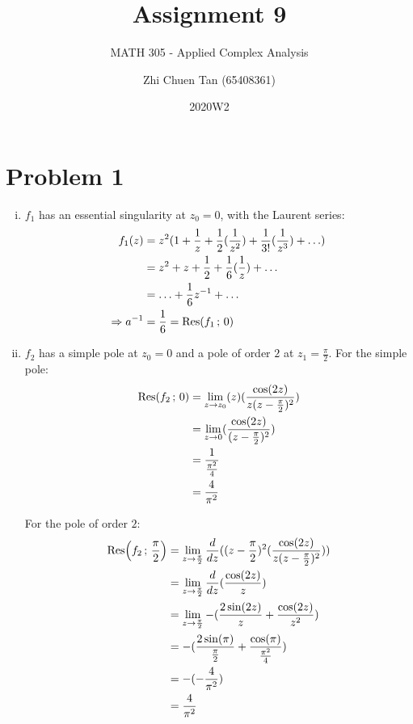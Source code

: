 \documentclass[letterpaper, titlepage, DIV=14]{scrartcl}
\title{Assignment 9}
\subtitle{MATH 305 - Applied Complex Analysis}
\author{Zhi Chuen Tan (65408361)}
\date{2020W2}
\begin{document}
    \onehalfspacing
    \hypersetup{pageanchor=false}
    \begin{titlepage}
        \maketitle
        \vfill
        
    \end{titlepage}
    \hypersetup{pageanchor=true}

    \section*{Problem 1}
    \begin{enumerate}[i)]
      \item $f_{1}$ has an essential singularity at $z_{0}=0$, with the Laurent series:
      \begin{align*}
        f_{1}(z) &= z^{2}(1 + \frac{1}{z} + \frac{1}{2}(\frac{1}{z^{2}}) + \frac{1}{3!}(\frac{1}{z^{3}}) + \ldots) \\
          &= z^{2} + z + \frac{1}{2} + \frac{1}{6}(\frac{1}{z}) + \ldots \\
          &= \ldots + \frac{1}{6}z^{-1} + \ldots \\
        \Rightarrow a^{-1} &= \frac{1}{6} = \Res(f_{1} \, ; \, 0)
      \end{align*}
      
      
      \item
      $f_{2}$ has a simple pole at $z_{0}=0$ and a pole of order $2$ at $z_{1}=\frac{\pi}{2}$. For the simple pole:
      \begin{align*}
        \Res(f_{2} \, ; \, 0) &= \lim_{z\to z_{0}}(z)(\frac{\cos(2z)}{z(z-\frac{\pi}{2})^{2}}) \\
          &= \lim_{z\to 0}(\frac{\cos(2z)}{(z-\frac{\pi}{2})^{2}}) \\
          &= \frac{1}{\frac{\pi^{2}}{4}} \\
          &= \frac{4}{\pi^{2}}
      \end{align*}

      For the pole of order $2$:
      \begin{align*}
        \Res(f_{2} \, ; \, \frac{\pi}{2}) &= \lim_{z\to \frac{\pi}{2}} \frac{d}{dz}((z-\frac{\pi}{2})^{2}(\frac{\cos(2z)}{z(z-\frac{\pi}{2})^{2}})) \\
        &= \lim_{z\to \frac{\pi}{2}} \frac{d}{dz}(\frac{\cos(2z)}{z}) \\
        &= \lim_{z\to \frac{\pi}{2}} -(\frac{2\sin(2z)}{z} + \frac{\cos(2z)}{z^{2}}) \\
        &= -(\frac{2\sin(\pi)}{\frac{\pi}{2}} + \frac{\cos(\pi)}{\frac{\pi^{2}}{4}}) \\
        &= -(-\frac{4}{\pi^{2}}) \\
        &= \frac{4}{\pi^{2}}
      \end{align*}


\end{enumerate}
\end{document}
